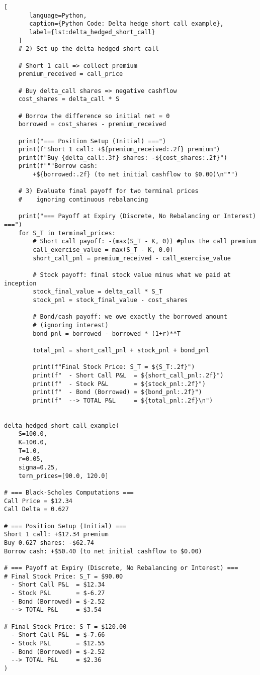 \begin{lstlisting}[
       language=Python,
       caption={Python Code: Delta hedge short call example},
       label={lst:delta_hedged_short_call}
    ]
    # 2) Set up the delta-hedged short call

    # Short 1 call => collect premium
    premium_received = call_price

    # Buy delta_call shares => negative cashflow
    cost_shares = delta_call * S

    # Borrow the difference so initial net = 0
    borrowed = cost_shares - premium_received

    print("=== Position Setup (Initial) ===")
    print(f"Short 1 call: +${premium_received:.2f} premium")
    print(f"Buy {delta_call:.3f} shares: -${cost_shares:.2f}")
    print(f"""Borrow cash:
        +${borrowed:.2f} (to net initial cashflow to $0.00)\n""")

    # 3) Evaluate final payoff for two terminal prices
    #    ignoring continuous rebalancing

    print("=== Payoff at Expiry (Discrete, No Rebalancing or Interest) ===")
    for S_T in terminal_prices:
        # Short call payoff: -(max(S_T - K, 0)) #plus the call premium
        call_exercise_value = max(S_T - K, 0.0)
        short_call_pnl = premium_received - call_exercise_value

        # Stock payoff: final stock value minus what we paid at inception
        stock_final_value = delta_call * S_T
        stock_pnl = stock_final_value - cost_shares

        # Bond/cash payoff: we owe exactly the borrowed amount
        # (ignoring interest)
        bond_pnl = borrowed - borrowed * (1+r)**T

        total_pnl = short_call_pnl + stock_pnl + bond_pnl

        print(f"Final Stock Price: S_T = ${S_T:.2f}")
        print(f"  - Short Call P&L  = ${short_call_pnl:.2f}")
        print(f"  - Stock P&L       = ${stock_pnl:.2f}")
        print(f"  - Bond (Borrowed) = ${bond_pnl:.2f}")
        print(f"  --> TOTAL P&L     = ${total_pnl:.2f}\n")


delta_hedged_short_call_example(
    S=100.0,
    K=100.0,
    T=1.0,
    r=0.05,
    sigma=0.25,
    term_prices=[90.0, 120.0]

# === Black-Scholes Computations ===
Call Price = $12.34
Call Delta = 0.627

# === Position Setup (Initial) ===
Short 1 call: +$12.34 premium
Buy 0.627 shares: -$62.74
Borrow cash: +$50.40 (to net initial cashflow to $0.00)

# === Payoff at Expiry (Discrete, No Rebalancing or Interest) ===
# Final Stock Price: S_T = $90.00
  - Short Call P&L  = $12.34
  - Stock P&L       = $-6.27
  - Bond (Borrowed) = $-2.52
  --> TOTAL P&L     = $3.54

# Final Stock Price: S_T = $120.00
  - Short Call P&L  = $-7.66
  - Stock P&L       = $12.55
  - Bond (Borrowed) = $-2.52
  --> TOTAL P&L     = $2.36
)
   \end{lstlisting}

